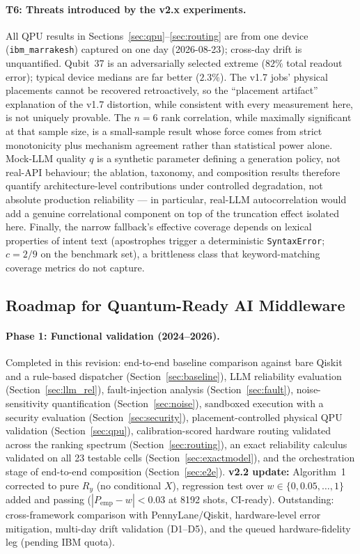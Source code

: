 ﻿\documentclass[12pt,a4paper]{article}
\begin{document}
\paragraph{T6: Threats introduced by the v2.x experiments.} All QPU results in Sections~\ref{sec:qpu}--\ref{sec:routing} are from one device (\texttt{ibm\_marrakesh}) captured on one day (2026-08-23); cross-day drift is unquantified. Qubit~37 is an adversarially selected extreme ($82\%$ total readout error); typical device medians are far better ($2.3\%$). The v1.7 jobs' physical placements cannot be recovered retroactively, so the ``placement artifact'' explanation of the v1.7 distortion, while consistent with every measurement here, is not uniquely provable. The $n{=}6$ rank correlation, while maximally significant at that sample size, is a small-sample result whose force comes from strict monotonicity plus mechanism agreement rather than statistical power alone. Mock-LLM quality $q$ is a synthetic parameter defining a generation policy, not real-API behaviour; the ablation, taxonomy, and composition results therefore quantify architecture-level contributions under controlled degradation, not absolute production reliability --- in particular, real-LLM autocorrelation would add a genuine correlational component on top of the truncation effect isolated here. Finally, the narrow fallback's effective coverage depends on lexical properties of intent text (apostrophes trigger a deterministic \texttt{SyntaxError}; $c = 2/9$ on the benchmark set), a brittleness class that keyword-matching coverage metrics do not capture.

\subsection{Roadmap for Quantum-Ready AI Middleware}\label{sec:roadmap}

\paragraph{Phase 1: Functional validation (2024--2026).} Completed in this revision: end-to-end baseline comparison against bare Qiskit and a rule-based dispatcher (Section~\ref{sec:baseline}), LLM reliability evaluation (Section~\ref{sec:llm_rel}), fault-injection analysis (Section~\ref{sec:fault}), noise-sensitivity quantification (Section~\ref{sec:noise}), sandboxed execution with a security evaluation (Section~\ref{sec:security}), placement-controlled physical QPU validation (Section~\ref{sec:qpu}), calibration-scored hardware routing validated across the ranking spectrum (Section~\ref{sec:routing}), an exact reliability calculus validated on all 23 testable cells (Section~\ref{sec:exactmodel}), and the orchestration stage of end-to-end composition (Section~\ref{sec:e2e}). \textbf{v2.2 update:} Algorithm~1 corrected to pure $R_y$ (no conditional $X$), regression test over $w\in\{0,0.05,\ldots,1\}$ added and passing ($|P_{\mathrm{emp}}-w|<0.03$ at 8192 shots, CI-ready). Outstanding: cross-framework comparison with PennyLane/Qiskit, hardware-level error mitigation, multi-day drift validation (D1--D5), and the queued hardware-fidelity leg (pending IBM quota).
\end{document}
